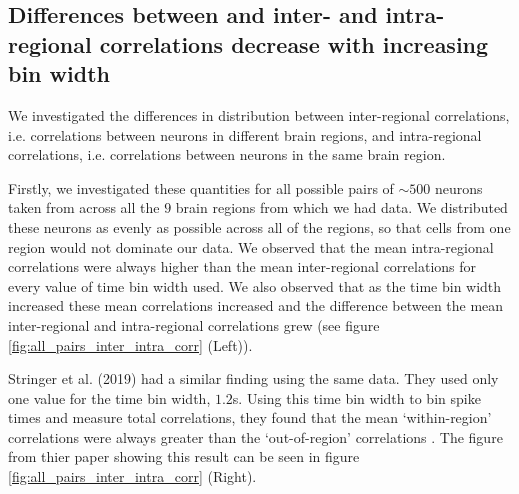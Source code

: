   \subsection{Differences between and inter- and intra- regional correlations decrease with increasing bin width}
  We investigated the differences in distribution between inter-regional correlations, i.e. correlations between neurons in different brain regions, and intra-regional correlations, i.e. correlations between neurons in the same brain region.

  Firstly, we investigated these quantities for all possible pairs of $\sim 500$ neurons taken from across all the $9$ brain regions from which we had data. We distributed these neurons as evenly as possible across all of the regions, so that cells from one region would not dominate our data. We observed that the mean intra-regional correlations were always higher than the mean inter-regional correlations for every value of time bin width used. We also observed that as the time bin width increased these mean correlations increased and the difference between the mean inter-regional and intra-regional correlations grew (see figure \ref{fig:all_pairs_inter_intra_corr} (Left)).

  Stringer et al. (2019) had a similar finding using the same data. They used only one value for the time bin width, $1.2$s. Using this time bin width to bin spike times and measure total correlations, they found that the mean `within-region' correlations were always greater than the `out-of-region' correlations  \parencite{stringer}. The figure from thier paper showing this result can be seen in figure \ref{fig:all_pairs_inter_intra_corr} (Right).

